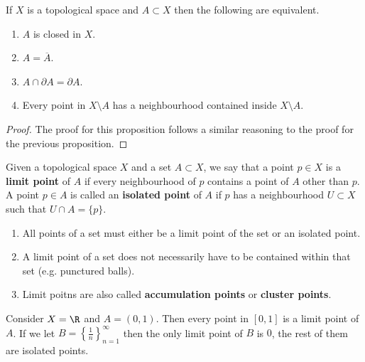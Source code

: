 \begin{proposition}[]
	If $X$ is a topological space and $A \subset X$ then the following 
	are equivalent.
	\begin{enumerate}
		\item $A$ is closed in $X$.
		\item $A = \overline{A}$. 
		\item $A \cap \partial A = \partial A$.
		\item Every point in $X \setminus A$ has a neighbourhood contained
			inside $X \setminus A$.
	\end{enumerate}
\end{proposition}

\begin{proof}
	The proof for this proposition follows a similar reasoning to the proof for
	the previous proposition.
\end{proof}

\begin{definition}[]
	Given a topological space $X$ and a set $A \subset X$, we say that a point
	$p \in X$ is a \textbf{limit point} of $A$ if every neighbourhood of $p$
	contains a point of $A$ other than $p$. 
	A point $p \in A$ is called an \textbf{isolated point} of $A$ if $p$ has a
	neighbourhood $U \subset X$ such that $U \cap A = \{p\}$.
\end{definition}

\begin{remark}
	\hfill
	\begin{enumerate}
		\item All points of a set must either be a limit point of the set or an
			isolated point.
	
		\item A limit point of a set does not necessarily have to be contained 
			within that set (e.g. punctured balls).

		\item Limit poitns are also called \textbf{accumulation points} or
			\textbf{cluster points}.
	\end{enumerate}
\end{remark}

\begin{example}[]
	Consider $X = \R$ and $A = (0,1)$. 
	Then every point in $[0,1]$ is a limit point of $A$.
	If we let $B = \left\{ \frac1n \right\}_{n=1}^\infty$
	then the only limit point of $B$ is $0$, the rest of them are
	isolated points.
\end{example}

